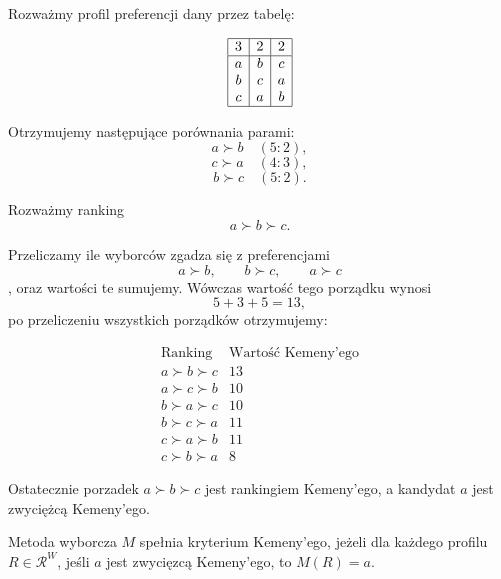 \documentclass[12pt,a4paper]{mwrep}
\begin{document}
	\begin{example}
		\label{przyklad:kemeny}
		Rozważmy profil preferencji dany przez tabelę:
		
		\begin{table}[H]
			\centering
			\[
			\begin{array}{|c|c|c|}
				\hline
				3 & 2 & 2\\
				\hline
				a & b & c\\
				b & c & a\\
				c & a & b\\
				\hline
			\end{array}
			\]
			\caption{Profil preferencji dla metody Kemeny’ego}
			\label{tab:kemeny_example}
		\end{table}
	
		Otrzymujemy następujące porównania parami:
		\[
		a \succ b \quad (5:2),
		\]
		\[
		c \succ a \quad (4:3),
		\]
		\[
		b \succ c \quad (5:2).
		\]
		
		Rozważmy ranking
		\[
		a \succ b \succ c.
		\]
		
		Przeliczamy ile wyborców zgadza się z preferencjami
		\[a \succ b, \qquad b\succ c, \qquad a \succ c\],
		oraz wartości te sumujemy. Wówczas wartość tego porządku wynosi
		\[
		5 + 3 + 5 = 13,
		\]
		po przeliczeniu wszystkich porządków otrzymujemy:
		
		\[
		\begin{array}{c|c}
			\text{Ranking} & \text{Wartość Kemeny’ego}\\
			\hline
			a \succ b \succ c & 13\\
			a \succ c \succ b & 10\\
			b \succ a \succ c & 10\\
			b \succ c \succ a & 11\\
			c \succ a \succ b & 11\\
			c \succ b \succ a & 8
		\end{array}
		\]
		
		Ostatecznie porzadek \(a\succ b\succ c\) jest rankingiem Kemeny'ego, a kandydat \(a\) jest zwyciężcą Kemeny'ego.
	\end{example}

	\begin{definition}
		\label{def:kryterium_kemeny}
		Metoda wyborcza \(M\) spełnia kryterium Kemeny’ego, jeżeli dla każdego profilu \(R \in \mathcal{R}^W\), jeśli \(a\) jest zwycięzcą Kemeny’ego, to \(M(R) = a\).
	\end{definition}
\end{document}
